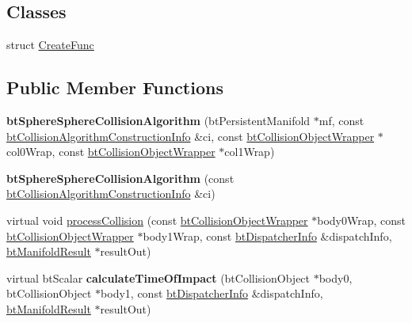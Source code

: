 \subsection*{Classes}
\begin{DoxyCompactItemize}
\item 
struct \hyperlink{structbtSphereSphereCollisionAlgorithm_1_1CreateFunc}{Create\+Func}
\end{DoxyCompactItemize}
\subsection*{Public Member Functions}
\begin{DoxyCompactItemize}
\item 
\mbox{\label{classbtSphereSphereCollisionAlgorithm_a861896f2389f4b8b4a45fda9dc5f5a88}} 
{\bfseries bt\+Sphere\+Sphere\+Collision\+Algorithm} (bt\+Persistent\+Manifold $\ast$mf, const \hyperlink{structbtCollisionAlgorithmConstructionInfo}{bt\+Collision\+Algorithm\+Construction\+Info} \&ci, const \hyperlink{structbtCollisionObjectWrapper}{bt\+Collision\+Object\+Wrapper} $\ast$col0\+Wrap, const \hyperlink{structbtCollisionObjectWrapper}{bt\+Collision\+Object\+Wrapper} $\ast$col1\+Wrap)
\item 
\mbox{\label{classbtSphereSphereCollisionAlgorithm_a0e088c92f8e8a1e5a82b118dec7f930c}} 
{\bfseries bt\+Sphere\+Sphere\+Collision\+Algorithm} (const \hyperlink{structbtCollisionAlgorithmConstructionInfo}{bt\+Collision\+Algorithm\+Construction\+Info} \&ci)
\item 
virtual void \hyperlink{classbtSphereSphereCollisionAlgorithm_a7e5adac437f8c0cdb738360d5946a65d}{process\+Collision} (const \hyperlink{structbtCollisionObjectWrapper}{bt\+Collision\+Object\+Wrapper} $\ast$body0\+Wrap, const \hyperlink{structbtCollisionObjectWrapper}{bt\+Collision\+Object\+Wrapper} $\ast$body1\+Wrap, const \hyperlink{structbtDispatcherInfo}{bt\+Dispatcher\+Info} \&dispatch\+Info, \hyperlink{classbtManifoldResult}{bt\+Manifold\+Result} $\ast$result\+Out)
\item 
\mbox{\label{classbtSphereSphereCollisionAlgorithm_a5866a58caa774b032f8563ab4cdb2747}} 
virtual bt\+Scalar {\bfseries calculate\+Time\+Of\+Impact} (bt\+Collision\+Object $\ast$body0, bt\+Collision\+Object $\ast$body1, const \hyperlink{structbtDispatcherInfo}{bt\+Dispatcher\+Info} \&dispatch\+Info, \hyperlink{classbtManifoldResult}{bt\+Manifold\+Result} $\ast$result\+Out)

\end{DoxyCompactItemize}
